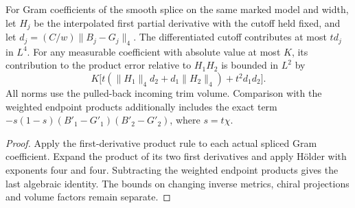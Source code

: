 \begin{proposition}
\label{prop:ed03-selected-quadratic-jets}
\leanok
For Gram coefficients of the smooth splice on the same marked model and
width, let $H_j$ be the interpolated first partial derivative with the
cutoff held fixed, and let $d_j=(C/w)\|B_j-G_j\|_4$. The differentiated
cutoff contributes at most $t d_j$ in $L^4$. For any measurable coefficient
with absolute value at most $K$, its contribution to the product error
relative to $H_1H_2$ is bounded in $L^2$ by
\[
 K\big[t(\|H_1\|_4 d_2+d_1\|H_2\|_4)+t^2d_1d_2\big].
\]
All norms use the pulled-back incoming trim volume. Comparison with the
weighted endpoint products additionally includes the exact term
$-s(1-s)(B'_1-G'_1)(B'_2-G'_2)$, where $s=t\chi$.
\end{proposition}
\begin{proof}
\leanok
Apply the first-derivative product rule to each actual spliced Gram
coefficient. Expand the product of its two first derivatives and apply
H\"older with exponents four and four. Subtracting the weighted endpoint
products gives the last algebraic identity. The bounds on changing
inverse metrics, chiral projections and volume factors remain separate.
\end{proof}

